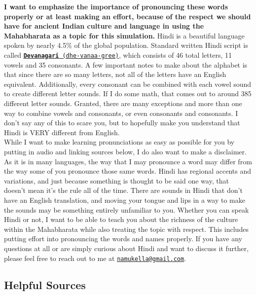 \documentclass[10pt, letterpaper]{article}
\begin{document}
\textbf{I want to emphasize the importance of pronouncing these words
properly or at least making an effort, because of the respect we should
have for ancient Indian culture and language in using the Mahabharata as
a topic for this simulation.} Hindi is a beautiful language spoken by
nearly 4.5\% of the global population. Standard written Hindi script is
called
\texttt{\underline{\href{https://drive.google.com/file/d/1I3jnjKKe0YlWLxt5QxQtXPJ2REhxeSxh/view?usp=sharing}{\textbf{Devanagari}}
(dhe-vanaa-gree)}}, which consists of 46 total letters, 11 vowels and 35
consonants. A few important notes to make about the alphabet is that
since there are so many letters, not all of the letters have an English
equivalent. Additionally, every consonant can be combined with each
vowel sound to create different letter sounds. If I do some math, that
comes out to around 385 different letter sounds. Granted, there are many
exceptions and more than one way to combine vowels and consonants, or
even consonants and consonants. I don't say any of this to scare you,
but to hopefully make you understand that Hindi is VERY different from
English. \\ 

While I want to make learning pronunciations as easy as possible for you
by putting in audio and linking sources below, I do also want to make a
disclaimer. As it is in many languages, the way that I may pronounce a
word may differ from the way some of you pronounce those same words.
Hindi has regional accents and variations, and just because something is
thought to be said one way, that doesn't mean it's the rule all of the
time. There are sounds in Hindi that don't have an English translation,
and moving your tongue and lips in a way to make the sounds may be
something entirely unfamiliar to you. Whether you can speak Hindi or
not, I want to be able to teach you about the richness of the culture
within the Mahabharata while also treating the topic with respect. This
includes putting effort into pronouncing the words and names properly.
If you have any questions at all or are simply curious about Hindi and
want to discuss it further, please feel free to reach out to me at
\texttt{\href{mailto:namukella@gmail.com}{\underline{namukella@gmail.com}}}.

\subsection{Helpful Sources}
\end{document}
